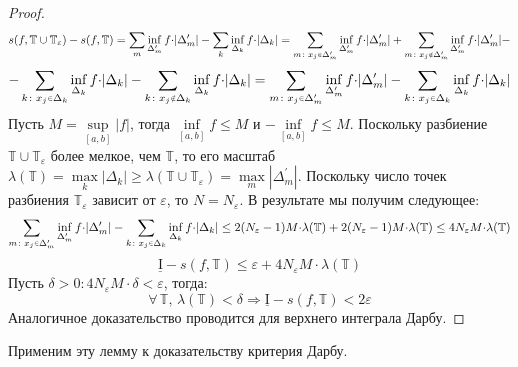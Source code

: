 \documentclass[12pt]{article}
\newcommand{\MTB}{\mathbb{T}}
\newcommand{\MI}{\mathrm{I}}
\newcommand{\VE}{\varepsilon}
\theoremstyle{definition}
\newcommand{\smallerrel}[1]{\mathrel{\mathpalette\smallerrelaux{#1}}}
\newcommand{\smallerrelaux}[2]{\raisebox{.1ex}{\scalebox{.75}{$#1#2$}}}
\newcommand{\smallin}{\smallerrel{\in}}
\newcommand{\smallnotin}{\smallerrel{\notin}}
\begin{document}
\begin{proof}
	$$
		s(f,\MTB \cup \MTB_\VE) - s(f,\MTB) = \sum\limits_{m}\inf\limits_{\Delta_m^\prime}f{\cdot}|\Delta_m^\prime| - \sum\limits_{k}\inf\limits_{\Delta_k}f{\cdot}|\Delta_k| = \sum\limits_{m \colon x_j \smallin \Delta_m^\prime}\inf\limits_{\Delta_m^\prime}f{\cdot}|\Delta_m^\prime| + \sum\limits_{m \colon x_j \smallnotin \Delta_m^\prime}\inf\limits_{\Delta_m^\prime}f{\cdot}|\Delta_m^\prime| -
	$$
	$$
		- \sum\limits_{k \colon x_j \smallin \Delta_k}\inf\limits_{\Delta_k}f{\cdot}|\Delta_k| - \sum\limits_{k \colon x_j \smallnotin \Delta_k}\inf\limits_{\Delta_k}f{\cdot}|\Delta_k| = \sum\limits_{m \colon x_j \smallin \Delta_m^\prime}\inf\limits_{\Delta_m^\prime}f{\cdot}|\Delta_m^\prime| - \sum\limits_{k \colon x_j \smallin \Delta_k}\inf\limits_{\Delta_k}f{\cdot}|\Delta_k|
	$$
	Пусть $M = \sup\limits_{[a,b]}|f|$, тогда $\inf\limits_{[a,b]}f \leq M$ и $-\inf\limits_{[a,b]}f \leq M$. Поскольку разбиение $\MTB \cup \MTB_\VE$ более мелкое, чем $\MTB$, то его масштаб $\lambda(\MTB) = \max\limits_{k} |\Delta_k| \geq \lambda(\MTB \cup \MTB_\VE) = \max\limits_{m}|\Delta_m^\prime|$. Поскольку число точек разбиения $\MTB_\VE$ зависит от $\VE$, то $N = N_\VE$. В результате мы получим следующее:
	$$
		\sum\limits_{m \colon x_j \smallin \Delta_m^\prime}\inf\limits_{\Delta_m^\prime}f{\cdot}|\Delta_m^\prime| - \sum\limits_{k \colon x_j \smallin \Delta_k}\inf\limits_{\Delta_k}f{\cdot}|\Delta_k| \leq 2(N_\VE-1)M{\cdot} \lambda(\MTB) + 2(N_\VE-1)M{\cdot}	 \lambda(\MTB) \leq 4 N_\VE M {\cdot}\lambda(\MTB)
	$$
	$$
		\underline{\MI} - s(f,\MTB) \leq \VE + 4 N_\VE M {\cdot}\lambda(\MTB)
	$$
	Пусть $\delta > 0 \colon 4 N_\VE M {\cdot} \delta < \VE$, тогда:
	$$
		\forall \, \MTB, \, \lambda(\MTB) < \delta \Rightarrow \underline{\MI} - s(f,\MTB) < 2 \VE
	$$
	Аналогичное доказательство проводится для верхнего интеграла Дарбу.
\end{proof}

Применим эту лемму к доказательству критерия Дарбу.

\newpage
\end{document}
